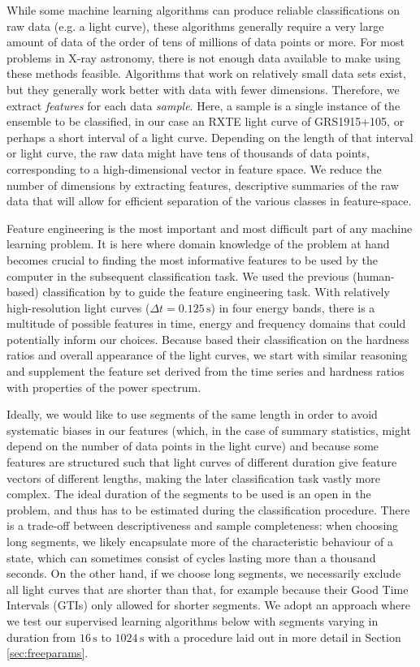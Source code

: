 \documentclass[12pt]{emulateapj}
\begin{document}
While some machine learning algorithms can produce reliable classifications on raw data (e.g. a light curve), these algorithms generally require a very large amount of data of the order of tens of millions of data points or more. 
For most problems in X-ray astronomy, there is not enough data available to make using these methods feasible. Algorithms that work on relatively small data sets exist, but they generally work better with data with fewer dimensions. Therefore, we extract \textit{features} for each data \textit{sample}. 
Here, a sample is a single instance of the ensemble to be classified, in our case an RXTE light curve of GRS1915+105, or perhaps a short interval of a light curve. Depending on the length of that interval or light curve, the raw data might have tens of thousands of data points, corresponding to a high-dimensional vector in feature space. We reduce the number of dimensions by extracting features, descriptive summaries of the raw data that will allow for efficient separation of the various classes in feature-space. 

Feature engineering is the most important and most difficult part of any machine learning problem. It is here where domain knowledge of the problem at hand becomes crucial to finding the most informative features to be used by the computer in the subsequent classification task. 
We used the previous (human-based) classification by \citet{belloni2000} to guide the feature engineering task. With relatively high-resolution light curves ($\Delta t = 0.125 \,\mathrm{s}$) in four energy bands, there is a multitude of possible features in time, energy and frequency domains that could potentially inform our choices. Because \citet{belloni2000} based their classification on the hardness ratios and overall appearance of the light curves, we start with similar reasoning and supplement the feature set derived from the time series and hardness ratios with properties of the power spectrum. 

Ideally, we would like to use segments of the same length in order to avoid systematic biases in our features (which, in the case of summary statistics, might depend on the number of data points in the light curve) and because some features are structured such that light curves of different duration give feature vectors of different lengths, making the later classification task vastly more complex. The ideal duration of the segments to be used is an open  in the problem, and thus has to be estimated during the classification procedure. There is a trade-off between descriptiveness and sample completeness: when choosing long segments, we likely encapsulate more of the characteristic behaviour of a state, which can sometimes consist of cycles lasting more than a thousand seconds. On the other hand, if we choose long segments, we necessarily exclude all light curves that are shorter than that, for example because their Good Time Intervals (GTIs) only allowed for shorter segments. We adopt an approach where we test our supervised learning algorithms below with segments varying in duration from $16\,\mathrm{s}$ to $1024\,\mathrm{s}$ with a procedure laid out in more detail in Section \ref{sec:freeparams}.
\end{document}
